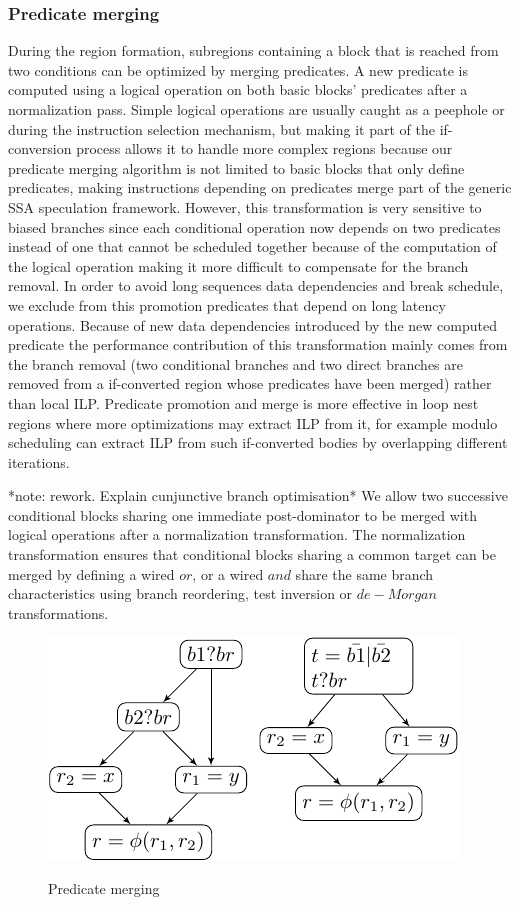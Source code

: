 \subsubsection{Predicate merging}

During the region formation, subregions containing a block that is reached from two conditions can be optimized by merging predicates. A new predicate is computed using a logical operation on both basic blocks' predicates after a normalization pass. Simple logical operations are usually caught as a peephole or during the instruction selection mechanism, but making it part of the if-conversion process allows it to handle more complex regions because our predicate merging algorithm is not limited to basic blocks that only define predicates, making instructions depending on predicates merge part of the generic SSA speculation framework. However, this transformation is very sensitive to biased branches since each conditional operation now depends on two predicates instead of one that cannot be scheduled together because of the computation of the logical operation making it more difficult to compensate for the branch removal. In order to avoid long sequences data dependencies and break schedule, we exclude from this promotion predicates that depend on long latency operations.
Because of new data dependencies introduced by the new computed predicate the performance contribution of this transformation mainly comes from the branch removal (two conditional branches and two direct branches are removed from a if-converted region whose predicates have been merged) rather than local ILP. Predicate promotion and merge is more effective in loop nest regions where more optimizations may extract ILP from it, for example modulo scheduling can extract ILP from such if-converted bodies by overlapping different iterations. 

*note: rework. Explain cunjunctive branch optimisation*
We allow two successive conditional blocks sharing one immediate post-dominator to be merged with logical operations after a normalization transformation. The normalization transformation ensures that conditional blocks sharing a common target can be merged by defining a wired $or$, or a wired $and$ share the same branch characteristics using branch reordering, test inversion or $de-Morgan$ transformations.

\begin{figure}
  \includegraphics[scale=0.8]{phi_merge}
  \label{fig:phi_merge}
\caption{Predicate merging}
\end{figure}

